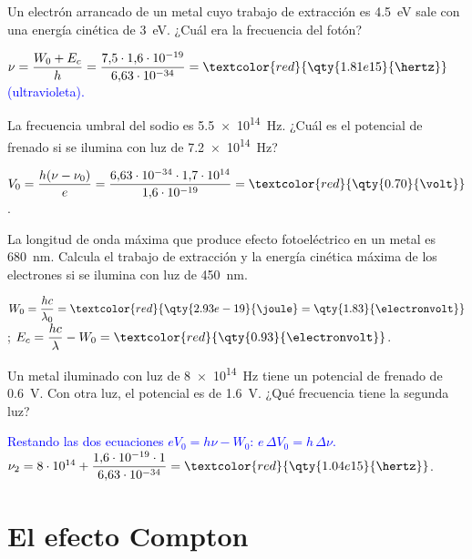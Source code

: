 \begin{exercise}
    Un electrón arrancado de un metal cuyo trabajo de extracción es \qty{4.5}{\electronvolt} sale con una energía cinética de
    \qty{3}{\electronvolt}. ¿Cuál era la frecuencia del fotón?
    \begin{solu}
        \(\nu = \dfrac{W_0 + E_c}{h} = \dfrac{7{,}5\cdot 1{,}6\cdot 10^{-19}}{6{,}63\cdot 10^{-34}} = \textcolor{red}{\qty{1.81e15}{\hertz}}\) \textcolor{blue}{(ultravioleta).}
    \end{solu}
\end{exercise}

\begin{exercise}
    La frecuencia umbral del sodio es \qty{5.5e14}{\hertz}. ¿Cuál es el potencial de frenado si se ilumina con luz de \qty{7.2e14}{\hertz}?
    \begin{solu}
        \(V_0 = \dfrac{h(\nu - \nu_0)}{e} = \dfrac{6{,}63\cdot 10^{-34}\cdot 1{,}7\cdot 10^{14}}{1{,}6\cdot 10^{-19}} = \textcolor{red}{\qty{0.70}{\volt}}\).
    \end{solu}
\end{exercise}

\begin{exercise}
    La longitud de onda máxima que produce efecto fotoeléctrico en un metal es \qty{680}{\nm}. Calcula el trabajo de extracción y la
    energía cinética máxima de los electrones si se ilumina con luz de \qty{450}{\nm}.
    \begin{solu}
        \(W_0 = \dfrac{hc}{\lambda_0} = \textcolor{red}{\qty{2.93e-19}{\joule} = \qty{1.83}{\electronvolt}}\);
        \(E_c = \dfrac{hc}{\lambda} - W_0 = \textcolor{red}{\qty{0.93}{\electronvolt}}\).
    \end{solu}
\end{exercise}

\begin{exercise}
    Un metal iluminado con luz de \qty{8e14}{\hertz} tiene un potencial de frenado de \qty{0.6}{\volt}. Con otra luz, el potencial es de
    \qty{1.6}{\volt}. ¿Qué frecuencia tiene la segunda luz?
    \begin{solu}
        \textcolor{blue}{Restando las dos ecuaciones \(eV_0 = h\nu - W_0\): \(e\,\Delta V_0 = h\,\Delta\nu\).}
        \(\nu_2 = 8\cdot 10^{14} + \dfrac{1{,}6\cdot 10^{-19}\cdot 1}{6{,}63\cdot 10^{-34}} = \textcolor{red}{\qty{1.04e15}{\hertz}}\).
    \end{solu}
\end{exercise}

\section{El efecto Compton}\label{sec:cua-compton}

